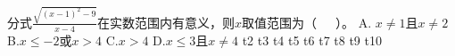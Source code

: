\markdownRendererDocumentBegin
\markdownRendererOlBeginTight
{}分式$\frac{\sqrt{(x-1)^2-9}}{x-4}$在实数范围内有意义，则$x$取值范围为（~~~）。\markdownRendererOlItemEnd 
\markdownRendererOlEndTight \markdownRendererInterblockSeparator
{}A. $x\neq 1$且$x\neq 2$ B.$x\le-2$或$x>4$ C.$x>4$ D.$x\le3$且$x\neq4$\markdownRendererInterblockSeparator
{}\markdownRendererOlBeginTight
{}t2\markdownRendererOlItemEnd 
{}t3\markdownRendererOlItemEnd 
{}t4\markdownRendererOlItemEnd 
{}t5\markdownRendererOlItemEnd 
{}t6\markdownRendererOlItemEnd 
{}t7\markdownRendererOlItemEnd 
{}t8\markdownRendererOlItemEnd 
{}t9\markdownRendererOlItemEnd 
{}t10\markdownRendererOlItemEnd 
\markdownRendererOlEndTight \markdownRendererDocumentEnd